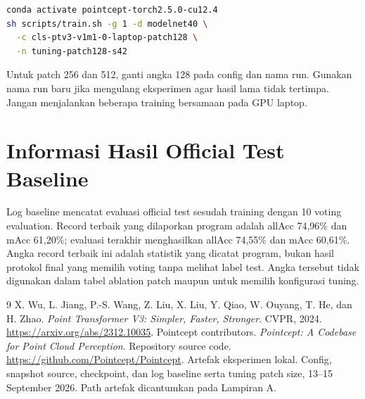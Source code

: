 \documentclass[11pt,a4paper]{article}
\begin{document}
\begin{lstlisting}[language=bash]
conda activate pointcept-torch2.5.0-cu12.4
sh scripts/train.sh -g 1 -d modelnet40 \
  -c cls-ptv3-v1m1-0-laptop-patch128 \
  -n tuning-patch128-s42
\end{lstlisting}
Untuk patch 256 dan 512, ganti angka 128 pada config dan nama run.
Gunakan nama run baru jika mengulang eksperimen agar hasil lama tidak
tertimpa. Jangan menjalankan beberapa training bersamaan pada GPU laptop.

\section{Informasi Hasil Official Test Baseline}
Log baseline mencatat evaluasi official test sesudah training dengan
10 voting evaluation. Record terbaik yang dilaporkan program adalah
allAcc 74,96\% dan mAcc 61,20\%; evaluasi terakhir menghasilkan
allAcc 74,55\% dan mAcc 60,61\%. Angka record terbaik ini adalah statistik
yang dicatat program, bukan hasil protokol final yang memilih voting
tanpa melihat label test. Angka tersebut tidak digunakan dalam tabel
ablation patch maupun untuk memilih konfigurasi tuning.

\begin{thebibliography}{9}
X. Wu, L. Jiang, P.-S. Wang, Z. Liu, X. Liu, Y. Qiao, W. Ouyang,
T. He, dan H. Zhao.
\textit{Point Transformer V3: Simpler, Faster, Stronger}.
CVPR, 2024. \url{https://arxiv.org/abs/2312.10035}.
\bibitem{pointcept}
Pointcept contributors. \textit{Pointcept: A Codebase for Point Cloud
Perception}. Repository source code.
\url{https://github.com/Pointcept/Pointcept}.
\bibitem{local}
Artefak eksperimen lokal. Config, snapshot source, checkpoint, dan log
baseline serta tuning patch size, 13--15 September 2026.
Path artefak dicantumkan pada Lampiran A.
\end{thebibliography}
\end{document}
